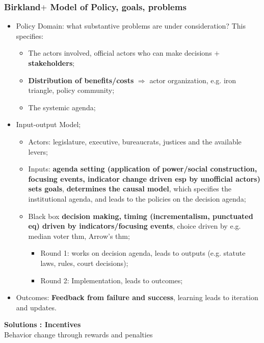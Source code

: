 \documentclass[aspectratio=169]{beamer}
\theoremstyle{principle}
\begin{document}
\begin{frame}
\frametitle{Birkland$+$ Model of Policy, goals, problems}
\begin{itemize}
\item Policy Domain: what substantive problems are under consideration?  This specifies:
\begin{itemize}
\item The actors involved, official actors who can make decisions $+$ \textbf{stakeholders}; 
\item \textbf{Distribution of benefits/costs} $\Rightarrow$ actor organization, e.g. iron triangle, policy community;
\item The systemic agenda; 
\end{itemize}
\bigskip
\item \color{black}Input-output Model;
\begin{itemize}
\item Actors: legislature, executive, bureaucrats, justices and the available levers;
\item Inputs: \textbf{agenda setting (application of power/social construction, focusing events, indicator change driven esp by unofficial actors)} \textbf{sets goals}, \textbf{determines the causal model}, which specifies the institutional agenda, and leads to the policies on the decision agenda;
\item Black box \textbf{decision making, timing (incrementalism, punctuated eq) driven by indicators/focusing events}, choice driven by e.g. median voter thm, Arrow's thm;
\begin{itemize}
\item Round 1: works on decision agenda, leads to outputs (e.g. statute laws, rules, court decisions);
\item Round 2: Implementation, leads to outcomes;
 \end{itemize}
\end{itemize}
\bigskip
\item Outcomes: \textbf{Feedback from failure and success}, learning leads to iteration and updates.
\end{itemize}
\end{frame}

\begin{frame}

\begin{center}
\Huge\textbf{Solutions : Incentives}\\
\bigskip
\bigskip
\large Behavior change through rewards and penalties
\end{center}

\end{frame}
\end{document}
